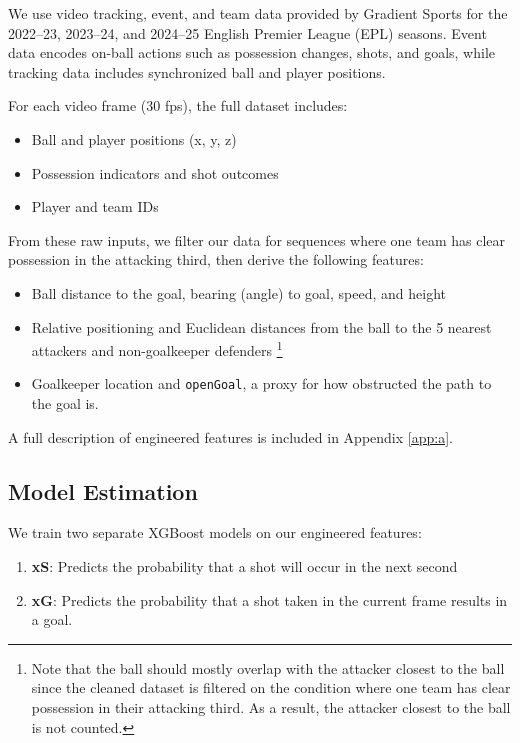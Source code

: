 \documentclass[12pt,letterpaper]{article}
\begin{document}
We use video tracking, event, and team data provided by Gradient Sports for the 2022--23, 2023--24, and 2024--25 English Premier League (EPL) seasons. Event data encodes on-ball actions such as possession changes, shots, and goals, while tracking data includes synchronized ball and player positions.

For each video frame (30 fps), the full dataset includes:
\begin{itemize}
  \item Ball and player positions (x, y, z)
  \item Possession indicators and shot outcomes
  \item Player and team IDs
\end{itemize}

From these raw inputs, we filter our data for sequences where one team has clear possession in the attacking third, then derive the following features:
\begin{itemize}
  \item Ball distance to the goal, bearing (angle) to goal, speed, and height
  \item Relative positioning and Euclidean distances from the ball to the 5 nearest attackers and non-goalkeeper defenders \footnote{Note that the ball should mostly overlap with the attacker closest to the ball since the cleaned dataset is filtered on the condition where one team has clear possession in their attacking third. As a result, the attacker closest to the ball is not counted.}
  \item Goalkeeper location and \texttt{openGoal}, a proxy for how obstructed the path to the goal is.
\end{itemize}

A full description of engineered features is included in Appendix \ref{app:a}.

\subsection{Model Estimation} \label{sec:model-estimation}

We train two separate XGBoost models on our engineered features:
\begin{enumerate}
  \item \textbf{xS}: Predicts the probability that a shot will occur in the next second
  \item \textbf{xG}: Predicts the probability that a shot taken in the current frame results in a goal.
\end{enumerate}
\end{document}
